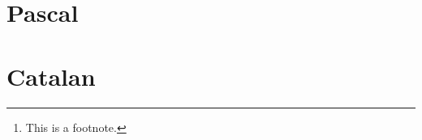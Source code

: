 \documentclass[10pt,a4paper]{article} %
\begin{document}
    \title{\rmfamily\normalfont{}}
    \author{ \\ }
    \date{\today} 
    
    \maketitle
    
    \begin{abstract}
        \noindent\lipsum[1] Just a test.\footnote{This is a footnote.}
    \end{abstract}
       
    \tableofcontents
    
    \section{Pascal}

    
    
    
    


    \section{Catalan}

    
    
    
    
    



    
\end{document}
